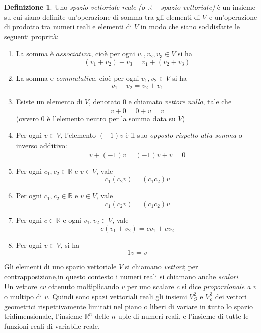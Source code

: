 \documentclass{book}
\theoremstyle{definition}
\newtheorem{defi}{Definizione}[section]
\theoremstyle{plain}
\begin{document}
\begin{defi}
  \label{def:spaziovect1}
  Uno \textit{spazio vettoriale reale (o $\mathds{R}-spazio$ vettoriale)} è un insieme su cui siano definite un'operazione di somma tra gli elementi di $V$ e un'operazione di prodotto tra numeri reali e elementi di $V$ in modo che siano soddisfatte le seguenti proprità:
  \begin{enumerate}
  \item La somma è $associativa$, cioè per ogni $v_1,v_2,v_3\in V$ si ha
    \begin{equation*}
      (v_1+v_2)+v_3=v_1+(v_2+v_3)
    \end{equation*}
  \item La somma e \textit{commutativa}, cioè per ogni $v_1,v_2\in V$ si ha
    \begin{equation*}
      v_1+v_2=v_2+v_1
    \end{equation*}
  \item Esiste un elemento di $V$, denotato $\bar{0}$ e chiamato \textit{vettore nullo}, tale che
    \begin{equation*}
      v+\bar{0}=\bar{0}+v=v
    \end{equation*}
    (ovvero $\bar{0}$ è l'elemento neutro per la somma data su $V$)
  \item Per ogni $v\in V$, l'elemento $(-1)v$ è il suo \textit{opposto rispetto alla somma} o inverso additivo:
    \begin{equation*}
      v+(-1)v= (-1)v+v=\bar{0}
    \end{equation*}
  \item Per ogni $c_1,c_2\in \mathds{R}$ e $v\in V$, vale
    \begin{equation*}
      c_1(c_2v)=(c_1c_2)v
    \end{equation*}
  \item Per ogni $c_1,c_2\in \mathds{R}$ e $v\in V$, vale
    \begin{equation*}
      c_1(c_2v)=(c_1c_2)v
    \end{equation*}
  \item Per ogni $c\in\mathds{R}$ e ogni $v_1,v_2\in V$, vale
    \begin{equation*}
      c(v_1+v_2)=cv_1+cv_2
    \end{equation*}
  \item Per ogni $v\in V$, si ha
    \begin{equation*}
      1v=v
    \end{equation*}
  \end{enumerate}
  Gli elementi di uno spazio vettoriale $V$ si chiamano \textit{vettori}; per contrapposizione,in questo contesto i numeri reali si chiamano anche \textit{scalari}.\\
  Un vettore $cv$ ottenuto moltiplicando $v$ per uno scalare $c$ si dice \textit{proporzionale a $v$} o multipo di $v$. Quindi sono spazi vettoriali reali gli insiemi $V_O^2$ e $V_o^3$ dei vettori geometrici rispettivamente limitati nel piano o liberi di variare in tutto lo spazio tridimensionale, l'insieme $\mathds{R}^n$ delle $n$-uple di numeri reali, e l'insieme di tutte le funzioni reali di variabile reale.
\end{defi}
\end{document}
